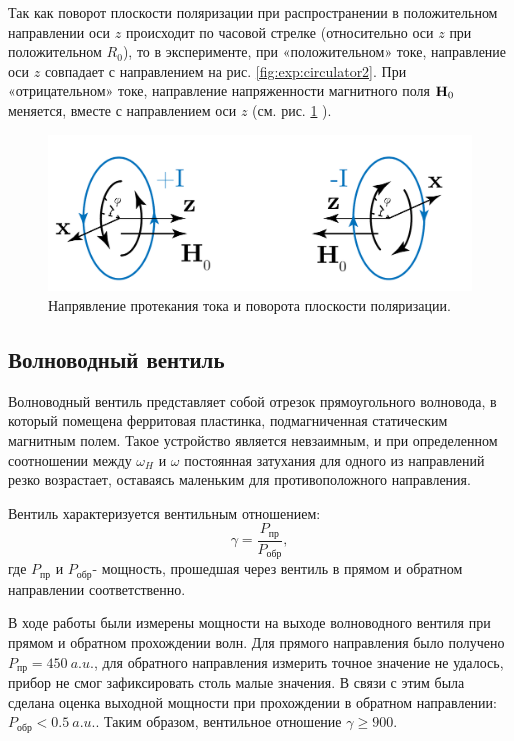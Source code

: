 Так как поворот плоскости поляризации при распространении в положительном направлении оси $z$ происходит по часовой
стрелке (относительно оси $z$ при положительном $R_0$), то в эксперименте, при «положительном» токе, направление оси $z$ совпадает с
направлением на рис. \ref{fig:exp:circulator2}. При «отрицательном» токе, направление напряженности магнитного поля
$\textbf{H}_0$ меняется, вместе с направлением оси $z$ (см. рис. \ref{fig:exp:circulator3} ).
\begin{figure}[h!]
    \centering
    \includegraphics[width = 0.7\linewidth]{imgs/circulator3.pdf}
    \caption{Напрявление протекания тока и поворота плоскости поляризации.}
    \label{fig:exp:circulator3}
\end{figure}
\subsection{Волноводный вентиль}
Волноводный вентиль представляет собой отрезок прямоугольного волновода, в который помещена ферритовая пластинка,
подмагниченная статическим магнитным полем. Такое устройство является невзаимным, и при определенном соотношении между
$\omega_{H}$ и $\omega$ постоянная затухания для одного из направлений резко возрастает, оставаясь маленьким для
противоположного направления.

Вентиль характеризуется вентильным отношением:
\begin{equation}
    \gamma = \frac{P_{\text{пр}}}{P_{\text{обр}}},
    \label{eq:3:1}
\end{equation}
где $P_{\text{пр}}$ и $P_{\text{обр}}$- мощность, прошедшая через вентиль в прямом и обратном направлении
соответственно.

В ходе работы были измерены мощности на выходе волноводного вентиля при прямом и обратном прохождении волн. Для прямого
направления было получено $P_{\text{пр}} = 450 ~a.u.$, для обратного направления измерить точное значение не удалось,
прибор не смог зафиксировать столь малые значения. В связи с этим была сделана оценка выходной мощности при прохождении
в обратном направлении: $P_{\text{обр}}<0.5 ~a.u.$. Таким образом, вентильное отношение $\gamma \geq 900$. 

